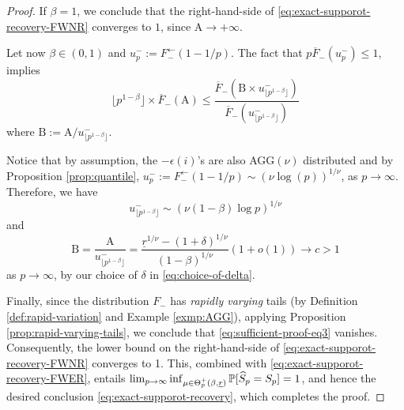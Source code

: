 \begin{proof}
If $\beta=1$, we conclude that the right-hand-side of \eqref{eq:exact-supporot-recovery-FWNR} 
converges to $1$, since $\text{A}\to+\infty$.

Let now $\beta\in (0,1)$ and $u_p^- :=  F_-^{\leftarrow}(1-1/p)$. 
The fact that $p\overline{F}_-(u_p^-) \le 1$, implies
\begin{equation}
    \lfloor p^{1-\beta} \rfloor \times \overline{F}_-(\text{A}) \le 
    \frac{\overline{F}_-\left(\text{B}\times{u_{\lfloor p^{1-\beta}\rfloor}^-}\right)} {\overline{F}_-\left({u_{\lfloor p^{1-\beta}\rfloor}^-}\right)} \label{eq:sufficient-proof-eq3}
\end{equation}
where $\text{B} := {\text{A}}/{u_{\lfloor p^{1-\beta}\rfloor}^-}$.

Notice that by assumption, the $-\epsilon(i)$'s are also 
AGG$(\nu)$ distributed and by Proposition \ref{prop:quantile}, 
$u_p^{-}:= F_-^{\leftarrow}(1-1/p) \sim (\nu \log(p))^{1/\nu}$,
as $p\to\infty$. Therefore, we have
\begin{equation} \label{eq:sufficient-proof-eq4}
    u_{\lfloor p^{1-\beta}\rfloor}^- \sim \left(\nu(1-\beta)\log{p}\right)^{1/\nu}
\end{equation}
and 
\begin{equation*}
\text{B} = \frac{\text{A}}{u_{\lfloor p^{1-\beta}\rfloor}^-}
= \frac{\underline{r}^{1/\nu} - (1+\delta)^{1/\nu}}{(1-\beta)^{1/\nu}}\left(1+o(1)\right) \to c>1
\end{equation*}
as $p\to\infty$, by our choice of $\delta$ in \eqref{eq:choice-of-delta}.

Finally, since the distribution $F_-$ has \emph{rapidly varying} tails (by Definition \ref{def:rapid-variation} and Example \ref{exmp:AGG}), applying Proposition \ref{prop:rapid-varying-tails}, we conclude that \eqref{eq:sufficient-proof-eq3} vanishes. Consequently, the lower bound on the right-hand-side of \eqref{eq:exact-supporot-recovery-FWNR} converges to 1.
This, combined with \eqref{eq:exact-supporot-recovery-FWER}, entails {$\lim_{p\to\infty} \inf_{\mu\in\Theta_p^+(\beta, \underline{r})} \P[\widehat{S}_p = S_p]= 1$, and hence the desired conclusion \eqref{eq:exact-supporot-recovery}, which completes the proof}.
\end{proof}

